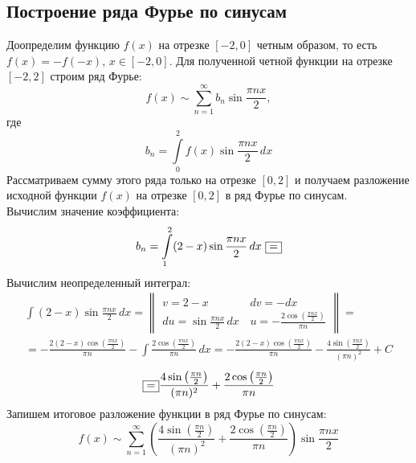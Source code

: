 \documentclass[a5paper, 10pt]{article}
\theoremstyle{definition}
\theoremstyle{plain}
\theoremstyle{remark}
\begin{document}
\newpage
\subsection{Построение ряда Фурье по синусам}
Доопределим функцию $f(x)$ на отрезке $[-2, 0]$ четным образом, то есть $f(x) = -f(-x), \, x \in [-2, 0]$. Для полученной четной функции на отрезке $[-2, 2]$ строим ряд Фурье:
\begin{equation*} 
f(x) \sim  \sum \limits_{n=1}^{\infty} b_n \sin \frac{\pi n x}{2},
\end{equation*}
где
\begin{equation*} 
b_n =  \int \limits_{0}^{2} f(x) \sin \frac{\pi n x}{2} \, dx
\end{equation*}
Рассматриваем сумму этого ряда только на отрезке $[0, 2]$ и получаем разложение исходной функции $f(x)$ на отрезке  $[0, 2]$ в ряд Фурье по синусам.\\
Вычислим значение коэффициента:
\begin{equation*} 
b_n =  \int \limits_{1}^{2} (2-x) \sin \frac{\pi n x}{2} \, dx \, \, \fbox{=}
\end{equation*}
Вычислим неопределенный интеграл:
\begin{multline*} 
 \int  (2-x) \sin \frac{\pi n x}{2} \, dx = 
\begin{Vmatrix}
v = 2-x \, & dv = -dx\\
du =   \sin \frac{\pi n x}{2} \, dx \, & u = -\frac{2 \cos \left( \frac{\pi n x}{2}\right)}{\pi n}
\end{Vmatrix}
=\\= - \frac{2 (2-x) \cos \left( \frac{\pi n x}{2}\right)}{\pi n} - \int \frac{2 \cos \left( \frac{\pi n x}{2}\right)}{\pi n}  \, dx =
-\frac{2 (2-x) \cos \left( \frac{\pi n x}{2}\right)}{\pi n} - \frac{4 \sin \left( \frac{\pi n x}{2} \right)}{(\pi n)^2} + C
\end{multline*}
\begin{equation*} 
 \fbox{=} \frac{4 \sin \left( \frac{\pi n}{2}\right)}{(\pi n)^2} + \frac{2 \cos \left( \frac{\pi n}{2}\right)}{\pi n}
\end{equation*}
Запишем итоговое разложение функции в ряд Фурье по синусам:
\begin{equation*} 
f(x) \sim  \sum \limits_{n=1}^{\infty} \left( \frac{4 \sin \left( \frac{\pi n}{2}\right)}{(\pi n)^2} + \frac{2 \cos \left( \frac{\pi n}{2}\right)}{\pi n} \right) \sin \frac{\pi n x}{2}
\end{equation*}


\newpage
\end{document}
